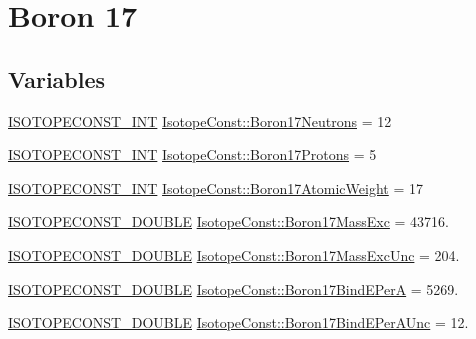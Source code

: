 \hypertarget{group___isotope_const-_boron-_b17}{}\section{Boron 17}
\label{group___isotope_const-_boron-_b17}
\subsection*{Variables}
\begin{DoxyCompactItemize}
\item 
\mbox{\hyperlink{group___isotope_const-_macros_ga5f18360b3e99483a35c32d789e62621c}{I\+S\+O\+T\+O\+P\+E\+C\+O\+N\+S\+T\+\_\+\+I\+NT}} \mbox{\hyperlink{group___isotope_const-_boron-_b17_ga1aa5b0324097d4fd09c744ba4713c05b}{Isotope\+Const\+::\+Boron17\+Neutrons}} = 12
\item 
\mbox{\hyperlink{group___isotope_const-_macros_ga5f18360b3e99483a35c32d789e62621c}{I\+S\+O\+T\+O\+P\+E\+C\+O\+N\+S\+T\+\_\+\+I\+NT}} \mbox{\hyperlink{group___isotope_const-_boron-_b17_gae3325a4891f7b71f1ef44abe910281d8}{Isotope\+Const\+::\+Boron17\+Protons}} = 5
\item 
\mbox{\hyperlink{group___isotope_const-_macros_ga5f18360b3e99483a35c32d789e62621c}{I\+S\+O\+T\+O\+P\+E\+C\+O\+N\+S\+T\+\_\+\+I\+NT}} \mbox{\hyperlink{group___isotope_const-_boron-_b17_ga4fb061f6f5e0c1a4ae1fb638826c568f}{Isotope\+Const\+::\+Boron17\+Atomic\+Weight}} = 17
\item 
\mbox{\hyperlink{group___isotope_const-_macros_ga8f45a7272ce02c0b4c65c44636ed719a}{I\+S\+O\+T\+O\+P\+E\+C\+O\+N\+S\+T\+\_\+\+D\+O\+U\+B\+LE}} \mbox{\hyperlink{group___isotope_const-_boron-_b17_ga50650df0316a8ce12b96c4200e2258fc}{Isotope\+Const\+::\+Boron17\+Mass\+Exc}} = 43716.
\item 
\mbox{\hyperlink{group___isotope_const-_macros_ga8f45a7272ce02c0b4c65c44636ed719a}{I\+S\+O\+T\+O\+P\+E\+C\+O\+N\+S\+T\+\_\+\+D\+O\+U\+B\+LE}} \mbox{\hyperlink{group___isotope_const-_boron-_b17_ga2cb0c254fad8f0e6fba6b730658f241d}{Isotope\+Const\+::\+Boron17\+Mass\+Exc\+Unc}} = 204.
\item 
\mbox{\hyperlink{group___isotope_const-_macros_ga8f45a7272ce02c0b4c65c44636ed719a}{I\+S\+O\+T\+O\+P\+E\+C\+O\+N\+S\+T\+\_\+\+D\+O\+U\+B\+LE}} \mbox{\hyperlink{group___isotope_const-_boron-_b17_ga45e3d7b0891332b5059de96e7e0865ae}{Isotope\+Const\+::\+Boron17\+Bind\+E\+PerA}} = 5269.
\item 
\mbox{\hyperlink{group___isotope_const-_macros_ga8f45a7272ce02c0b4c65c44636ed719a}{I\+S\+O\+T\+O\+P\+E\+C\+O\+N\+S\+T\+\_\+\+D\+O\+U\+B\+LE}} \mbox{\hyperlink{group___isotope_const-_boron-_b17_ga9b03bdbba6d4a176b6eba12bbfc6d189}{Isotope\+Const\+::\+Boron17\+Bind\+E\+Per\+A\+Unc}} = 12.

\end{DoxyCompactItemize}
